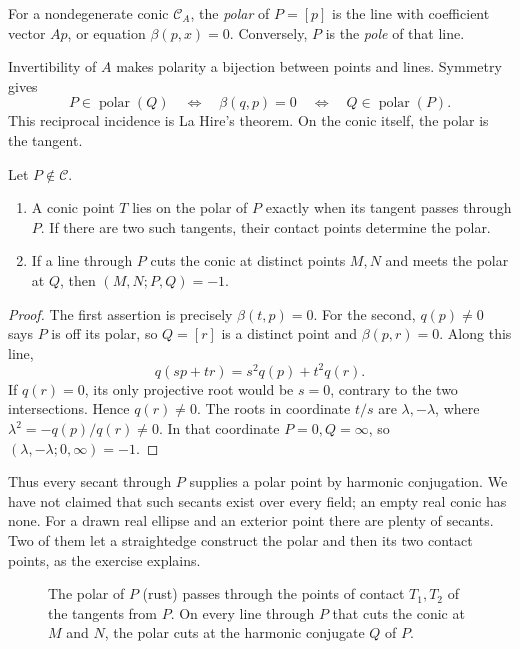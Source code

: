 \begin{definition}
For a nondegenerate conic $\mathcal C_A$, the \emph{polar} of $P=[p]$ is the line with coefficient vector $Ap$, or equation $\beta(p,x)=0$. Conversely, $P$ is the \emph{pole} of that line.
\end{definition}

Invertibility of $A$ makes polarity a bijection between points and lines. Symmetry gives
\[
P\in\operatorname{polar}(Q)\quad\Longleftrightarrow\quad
\beta(q,p)=0\quad\Longleftrightarrow\quad Q\in\operatorname{polar}(P).
\]
This reciprocal incidence is La Hire's theorem. On the conic itself, the polar is the tangent.

\begin{proposition}\label{geometry:prop:polar}
Let $P\notin\mathcal C$.
\begin{enumerate}
\item A conic point $T$ lies on the polar of $P$ exactly when its tangent passes through $P$. If there are two such tangents, their contact points determine the polar.
\item If a line through $P$ cuts the conic at distinct points $M,N$ and meets the polar at $Q$, then $(M,N;P,Q)=-1$.
\end{enumerate}
\end{proposition}
\begin{proof}
The first assertion is precisely $\beta(t,p)=0$. For the second, $q(p)\ne0$ says $P$ is off its polar, so $Q=[r]$ is a distinct point and $\beta(p,r)=0$. Along this line,
\[
q(sp+tr)=s^2q(p)+t^2q(r).
\]
If $q(r)=0$, its only projective root would be $s=0$, contrary to the two intersections. Hence $q(r)\ne0$. The roots in coordinate $t/s$ are $\lambda,-\lambda$, where $\lambda^2=-q(p)/q(r)\ne0$. In that coordinate $P=0,Q=\infty$, so $(\lambda,-\lambda;0,\infty)=-1$.
\end{proof}

Thus every secant through $P$ supplies a polar point by harmonic conjugation. We have not claimed that such secants exist over every field; an empty real conic has none. For a drawn real ellipse and an exterior point there are plenty of secants. Two of them let a straightedge construct the polar and then its two contact points, as the exercise explains.

\begin{figure}[ht]
\centering
{}
\caption{The polar of $P$ (rust) passes through the points of contact $T_1,T_2$ of the tangents from $P$. On every line through $P$ that cuts the
conic at $M$ and $N$, the polar cuts at the harmonic conjugate $Q$ of $P$.}
\label{geometry:fig:polar}
\end{figure}

